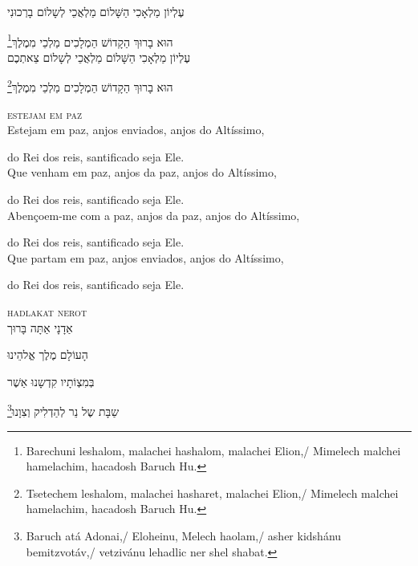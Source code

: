 עֶלְיוֹן מַלְאָכִי הַשָּׁלוֹם מַלְאֲכֵי לְשָלוֹם בָרְכוּנִי

\footnote{Barechuni leshalom, malachei hashalom, malachei Elion,/ Mimelech malchei hamelachim, hacadosh Baruch Hu.}הוּא בָרוּךְ הַקָדוֹשׁ הַמְלָכִים מַלְכֵי מִמֶלֶךְ\\[10pt] 

עֶלְיוֹן מַלְאָכִי הַשָּׁלוֹם מַלְאֲכֵי לְשָלוֹם צֵאתְכֶם 

\footnote{Tsetechem leshalom, malachei hasharet, malachei Elion,/ Mimelech malchei hamelachim, hacadosh Baruch Hu.}הוּא בָרוּךְ הַקָדוֹשׁ הַמְלָכִים מַלְכֵי מִמֶלֶךְ


\movetooddpage
\raggedright

\vspace*{1cm}

\textsc{estejam em paz}\\[15pt]


Estejam em paz, anjos enviados, anjos do Altíssimo,

do Rei dos reis, santificado seja Ele.\\[10pt]

Que venham em paz, anjos da paz, anjos do Altíssimo,

do Rei dos reis, santificado seja Ele.\\[10pt]

Abençoem-me com a paz, anjos da paz, anjos do Altíssimo,

do Rei dos reis, santificado seja Ele.\\[10pt]

Que partam em paz, anjos enviados, anjos do Altíssimo,

do Rei dos reis, santificado seja Ele.

\movetoevenpage
\raggedleft




\vspace*{1cm}

\textsc{hadlakat nerot}\\[15pt]

אַדָנָי אַתָּה בָּרוּך

הָעוֹלָם מֶלֶך אֱלהֵינוּ

בְּמִצְוֹתָיו קִדְשָנוּ אַשֶׁר

\footnote{Baruch atá Adonai,/ Eloheinu, Melech haolam,/ asher kidshánu bemitzvotáv,/ vetzivánu lehadlic ner shel shabat.}שַבָּת שֶל נֵר לְהַדְלִיק וְצִוָנוּ‏

\movetooddpage
\raggedright

